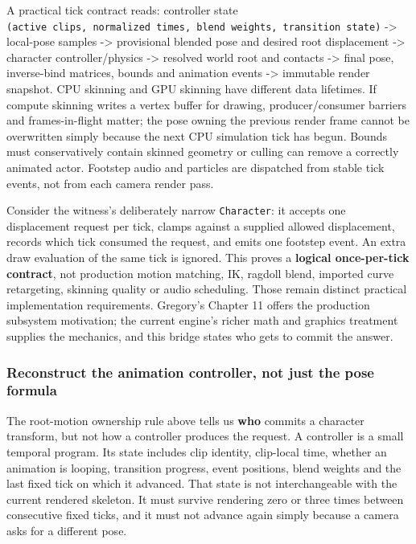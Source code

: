 A practical tick contract reads: controller state \texttt{(active\ clips,\ normalized\ times,\ blend\ weights,\ transition\ state)} -\textgreater{} local-pose samples -\textgreater{} provisional blended pose and desired root displacement -\textgreater{} character controller/physics -\textgreater{} resolved world root and contacts -\textgreater{} final pose, inverse-bind matrices, bounds and animation events -\textgreater{} immutable render snapshot. CPU skinning and GPU skinning have different data lifetimes. If compute skinning writes a vertex buffer for drawing, producer/consumer barriers and frames-in-flight matter; the pose owning the previous render frame cannot be overwritten simply because the next CPU simulation tick has begun. Bounds must conservatively contain skinned geometry or culling can remove a correctly animated actor. Footstep audio and particles are dispatched from stable tick events, not from each camera render pass.

Consider the witness's deliberately narrow \texttt{Character}: it accepts one displacement request per tick, clamps against a supplied allowed displacement, records which tick consumed the request, and emits one footstep event. An extra draw evaluation of the same tick is ignored. This proves a \textbf{logical once-per-tick contract}, not production motion matching, IK, ragdoll blend, imported curve retargeting, skinning quality or audio scheduling. Those remain distinct practical implementation requirements. Gregory's Chapter 11 offers the production subsystem motivation; the current engine's richer math and graphics treatment supplies the mechanics, and this bridge states who gets to commit the answer.

\subsubsection{Reconstruct the animation controller, not just the pose formula}\label{06-engine-ii-ch040-reconstruct-the-animation-controller-not-just-the-pose-formula}

\hypertarget{06-engine-ii-ch040-reconstruct-the-animation-controller-not-just-the-pose-formula}{}

The root-motion ownership rule above tells us \textbf{who} commits a character transform, but not how a controller produces the request. A controller is a small temporal program. Its state includes clip identity, clip-local time, whether an animation is looping, transition progress, event positions, blend weights and the last fixed tick on which it advanced. That state is not interchangeable with the current rendered skeleton. It must survive rendering zero or three times between consecutive fixed ticks, and it must not advance again simply because a camera asks for a different pose.

